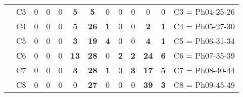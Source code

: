 \begin{table}[H]
{\begin{tabular}{|ccccccccccccc|}
\multicolumn{1}{|c|}{}                                      & \multicolumn{1}{c|}{C3} & \multicolumn{1}{c|}{0}  & \multicolumn{1}{c|}{0}  & \multicolumn{1}{c|}{0}  & \multicolumn{1}{c|}{\textbf{5}}  & \multicolumn{1}{c|}{\textbf{5}}  & \multicolumn{1}{c|}{0}  & \multicolumn{1}{c|}{0}  & \multicolumn{1}{c|}{0}  & \multicolumn{1}{c|}{0}  & \multicolumn{1}{c|}{0}  & C3 = Ph04-25-26   \\ \cline{2-13}
\multicolumn{1}{|c|}{}                                      & \multicolumn{1}{c|}{C4} & \multicolumn{1}{c|}{0}  & \multicolumn{1}{c|}{0}  & \multicolumn{1}{c|}{0}  & \multicolumn{1}{c|}{\textbf{5}}  & \multicolumn{1}{c|}{\textbf{26}} & \multicolumn{1}{c|}{\textbf{1}}  & \multicolumn{1}{c|}{0}  & \multicolumn{1}{c|}{0}  & \multicolumn{1}{c|}{\textbf{2}}  & \multicolumn{1}{c|}{\textbf{1}}  & C4 = Ph05-27-30   \\ \cline{2-13}
\multicolumn{1}{|c|}{}                                      & \multicolumn{1}{c|}{C5} & \multicolumn{1}{c|}{0}  & \multicolumn{1}{c|}{0}  & \multicolumn{1}{c|}{0}  & \multicolumn{1}{c|}{\textbf{3}}  & \multicolumn{1}{c|}{\textbf{19}} & \multicolumn{1}{c|}{\textbf{4}}  & \multicolumn{1}{c|}{0}  & \multicolumn{1}{c|}{0}  & \multicolumn{1}{c|}{\textbf{4}}  & \multicolumn{1}{c|}{\textbf{1}}  & C5 = Ph06-31-34   \\ \cline{2-13}
\multicolumn{1}{|c|}{}                                      & \multicolumn{1}{c|}{C6} & \multicolumn{1}{c|}{0}  & \multicolumn{1}{c|}{0}  & \multicolumn{1}{c|}{0}  & \multicolumn{1}{c|}{\textbf{13}} & \multicolumn{1}{c|}{\textbf{28}} & \multicolumn{1}{c|}{0}  & \multicolumn{1}{c|}{\textbf{2}}  & \multicolumn{1}{c|}{\textbf{2}}  & \multicolumn{1}{c|}{\textbf{24}} & \multicolumn{1}{c|}{\textbf{6}}  & C6 = Ph07-35-39   \\ \cline{2-13}
\multicolumn{1}{|c|}{}                                      & \multicolumn{1}{c|}{C7} & \multicolumn{1}{c|}{0}  & \multicolumn{1}{c|}{0}  & \multicolumn{1}{c|}{0}  & \multicolumn{1}{c|}{\textbf{3}}  & \multicolumn{1}{c|}{\textbf{28}} & \multicolumn{1}{c|}{\textbf{1}}  & \multicolumn{1}{c|}{0}  & \multicolumn{1}{c|}{\textbf{3}}  & \multicolumn{1}{c|}{\textbf{17}} & \multicolumn{1}{c|}{\textbf{5}}  & C7 = Ph08-40-44   \\ \cline{2-13}
\multicolumn{1}{|c|}{}                                      & \multicolumn{1}{c|}{C8} & \multicolumn{1}{c|}{0}  & \multicolumn{1}{c|}{0}  & \multicolumn{1}{c|}{0}  & \multicolumn{1}{c|}{0}  & \multicolumn{1}{c|}{\textbf{27}} & \multicolumn{1}{c|}{0}  & \multicolumn{1}{c|}{0}  & \multicolumn{1}{c|}{0}  & \multicolumn{1}{c|}{\textbf{39}} & \multicolumn{1}{c|}{\textbf{3}}  & C8 = Ph09-45-49   \\ \cline{2-13}

\end{tabular}}
\end{table}
